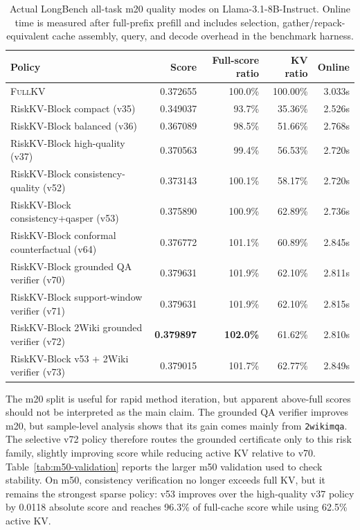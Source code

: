 \documentclass{article}
\newcommand{\method}{RiskKV-Block}
\newcommand{\fullkv}{\textsc{FullKV}}
\begin{document}
\begin{table}[t]
\centering
\caption{Actual LongBench all-task m20 quality modes on Llama-3.1-8B-Instruct. Online time is measured after full-prefix prefill and includes selection, gather/repack-equivalent cache assembly, query, and decode overhead in the benchmark harness.}
\label{tab:quality-modes}
\begin{tabular}{lrrrr}
\toprule
Policy & Score & Full-score ratio & KV ratio & Online \\
\midrule
\fullkv & 0.372655 & 100.0\% & 100.00\% & 3.033s \\
\method{} compact (v35) & 0.349037 & 93.7\% & 35.36\% & 2.526s \\
\method{} balanced (v36) & 0.367089 & 98.5\% & 51.66\% & 2.768s \\
\method{} high-quality (v37) & 0.370563 & 99.4\% & 56.53\% & 2.720s \\
\method{} consistency-quality (v52) & 0.373143 & 100.1\% & 58.17\% & 2.720s \\
\method{} consistency+qasper (v53) & 0.375890 & 100.9\% & 62.89\% & 2.736s \\
\method{} conformal counterfactual (v64) & 0.376772 & 101.1\% & 60.89\% & 2.845s \\
\method{} grounded QA verifier (v70) & 0.379631 & 101.9\% & 62.10\% & 2.811s \\
\method{} support-window verifier (v71) & 0.379631 & 101.9\% & 62.10\% & 2.815s \\
\method{} 2Wiki grounded verifier (v72) & \textbf{0.379897} & \textbf{102.0\%} & 61.62\% & 2.810s \\
\method{} v53 + 2Wiki verifier (v73) & 0.379015 & 101.7\% & 62.77\% & 2.849s \\
\bottomrule
\end{tabular}
\end{table}

The m20 split is useful for rapid method iteration, but apparent above-full scores should not be interpreted as the main claim.
The grounded QA verifier improves m20, but sample-level analysis shows that its gain comes mainly from \texttt{2wikimqa}.
The selective v72 policy therefore routes the grounded certificate only to this risk family, slightly improving score while reducing active KV relative to v70.
Table~\ref{tab:m50-validation} reports the larger m50 validation used to check stability.
On m50, consistency verification no longer exceeds full KV, but it remains the strongest sparse policy: v53 improves over the high-quality v37 policy by 0.0118 absolute score and reaches 96.3\% of full-cache score while using 62.5\% active KV.
\end{document}
